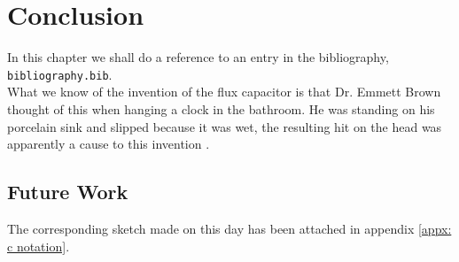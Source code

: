 \section{Conclusion}
\label{sec: Reference}

\noindent In this chapter we shall do a reference to an entry in the bibliography, \texttt{bibliography.bib}. \\

What we know of the invention of the flux capacitor is that Dr. Emmett Brown thought of this when hanging a clock in the bathroom. He was standing on his porcelain sink and slipped because it was wet, the resulting hit on the head was apparently a cause to this invention \cite{example}.\\
\subsection{Future Work}
The corresponding sketch made on this day has been attached in appendix \ref{appx: c notation}.

